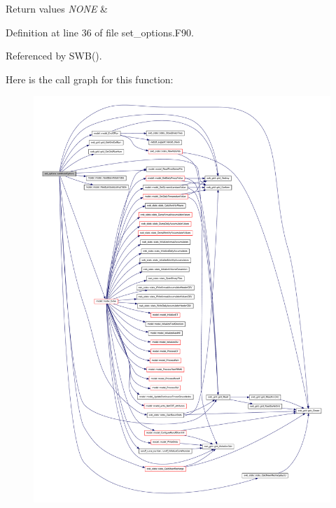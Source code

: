 \begin{DoxyRetVals}{Return values}
{\em NONE} & \\
\hline
\end{DoxyRetVals}


Definition at line 36 of file set\_\-options.F90.



Referenced by SWB().



Here is the call graph for this function:
\nopagebreak
\begin{figure}[H]
\begin{center}
\leavevmode
\includegraphics[width=400pt]{namespaceset__options_a9175270bec7efd77e8bd61c6df1f0269_cgraph}
\end{center}
\end{figure}


